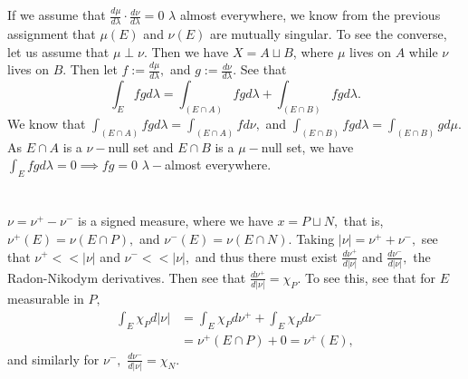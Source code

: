 \documentclass{article}
\begin{document}
\section{} %
If we assume that $\frac{d\mu}{d\lambda}\cdot \frac{d\nu}{d\lambda}=0$ $\lambda$ almost everywhere, we know from the previous assignment that $\mu(E)$ and 
$\nu(E)$ are mutually singular. To see the converse, let us assume that $\mu \perp \nu.$ Then we have $X=A \sqcup B$, where $\mu$ lives on $A$ while $\nu$ 
lives on $B.$ Then let $f:= \frac{d\mu}{d\lambda},$ and $g:=\frac{d\nu}{d\lambda}.$ See that $$\int_{E}fg d\lambda=\int_{(E\cap A)}fg d\lambda + 
\int_{(E\cap B)} fg d\lambda.$$ We know that $ \int_{(E\cap A)}fg d\lambda=\int_{(E\cap A)}f d\nu,$ and $ \int_{(E\cap B)}fg d\lambda=\int_{(E\cap B)}g 
d\mu.$ As $E \cap A$ is a $ \nu-$null set and $E \cap B$ is a $\mu-$null set, we have  $\int_{E}fg d\lambda=0 \implies fg=0$  $\lambda-$almost everywhere.
\section{} %
$\nu=\nu^+-\nu^-$ is a signed measure, where we have $x=P \sqcup N,$ that is, $\nu^+(E)=\nu(E \cap P),$ and $\nu^-(E)=\nu(E \cap N).$
Taking $|\nu|=\nu^+ +\nu^-,$ see that $ \nu^+ << |\nu|$ and $\nu^- << |\nu|,$ and thus there must exist $\frac{d\nu^+}{d|\nu|}$ and 
$\frac{d\nu^-}{d|\nu|},$ the Radon-Nikodym derivatives. Then see that $\frac{d\nu^+}{d|\nu|}=\chi_P.$ To see this, see that for $E$ measurable in $P,$
\begin{align*}
	\int_E \chi_{P}d|\nu| &= \int_E \chi_P d\nu^+ + \int_E \chi_P d\nu^-\\
	&= \nu^+(E\cap P)  + 0 = \nu^+(E),
\end{align*}
and similarly for $\nu^-,$ $\frac{d\nu^-}{d|\nu|}=\chi_N.$ 
\end{document}
